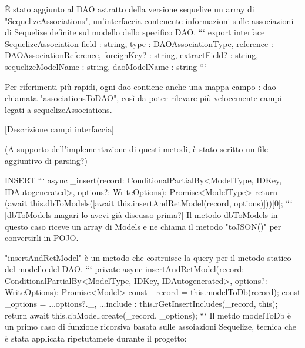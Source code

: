         È stato aggiunto al DAO astratto della versione sequelize un array di "SequelizeAssociations", un'interfaccia contenente informazioni sulle associazioni di Sequelize definite sul modello dello specifico DAO.
        ```
        export interface SequelizeAssociation {
            field : string,
            type : DAOAssociationType,
            reference : DAOAssociationReference,
            foreignKey? : string,
            extractField? : string,
            sequelizeModelName : string,
            daoModelName : string
        }
        ```

        Per riferimenti più rapidi, ogni dao contiene anche una mappa campo : dao chiamata "associationsToDAO", così da poter rilevare più velocemente campi legati a sequelizeAssociations.

        [Descrizione campi interfaccia]

        (A supporto dell'implementazione di questi metodi, è stato scritto un file aggiuntivo di parsing?)

        INSERT
            ```
            async _insert(record: ConditionalPartialBy<ModelType, IDKey, IDAutogenerated>, options?: WriteOptions): Promise<ModelType> {
                return (await this.dbToModels([await this.insertAndRetModel(record, options)]))[0];
            }
            ```
            [dbToModels magari lo avevi già discusso prima?]
            Il metodo dbToModels in questo caso riceve un array di Models e ne chiama il metodo "toJSON()" per convertirli in POJO.

            "insertAndRetModel" è un metodo che costruisce la query per il metodo statico del modello del DAO.
            ```
            private async insertAndRetModel(record: ConditionalPartialBy<ModelType, IDKey, IDAutogenerated>, options?: WriteOptions): Promise<Model> {
                const _record = this.modelToDb(record);
                const _options = {...options?._, ...{include : this.rGetInsertIncludes(_record, this)}};
                return await this.dbModel.create(_record, _options);
            }
            ```
            Il metdo modelToDb è un primo caso di funzione ricorsiva basata sulle assoiazioni Sequelize, tecnica che è stata applicata ripetutamete durante il progetto:

